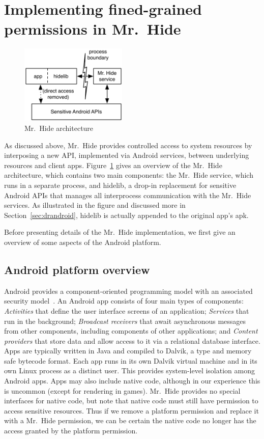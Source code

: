 \documentclass[preprint]{sig-alternate-10pt}
\newcommand{\code}[1]{\textsf{#1}}
\newcommand{\lib}{Mr.\ Hide\xspace}
\begin{document}
\section{Implementing fined-grained permissions in \lib}

\begin{figure}[t]
  \centering \includegraphics[width=2in]{hide-arch}
  \caption{\lib architecture}
  \label{fig:hide-arch}
\end{figure}

As discussed above, \lib provides controlled access to system
resources by interposing a new API, implemented via Android services,
between underlying resources and client apps.  
Figure~\ref{fig:hide-arch} gives an overview of the \lib architecture,
which contains two main components: the \lib service, which runs in a
separate process, and
\code{hidelib}, a drop-in replacement for sensitive Android APIs that
manages all interprocess communication with the \lib services. As
illustrated in the figure and discussed more in
Section~\ref{sec:drandroid}, \code{hidelib} is actually appended
to the original app's apk.

Before
presenting details of the \lib implementation, we first give an
overview of some aspects of the Android platform.

\subsection{Android platform overview}

Android provides a component-oriented programming model with an
associated security model~\cite{EOM09}.  An Android app consists of
four main types of components: {\em Activities} that define the user
interface screens of an application; {\em Services} that run in the
background; {\em Broadcast receivers} that await asynchronous messages
from other components, including components of other applications; and
{\em Content providers} that store data and allow access to it via a
relational database interface. Apps are typically written in Java and
compiled to Dalvik, a type and memory safe bytecode format. Each app
runs in its own Dalvik virtual machine and in its own Linux process as
a distinct user. This provides system-level isolation among Android
apps.
Apps may also include native code, although in our experience this is
uncommon (except for rendering in games).
\lib provides no special interfaces for
native code, but note that native code must still have permission to
access sensitive resources. Thus if we remove a platform permission
and replace it with a \lib permission, we can be certain the native
code no longer has the access granted by the platform permission.
\end{document}
